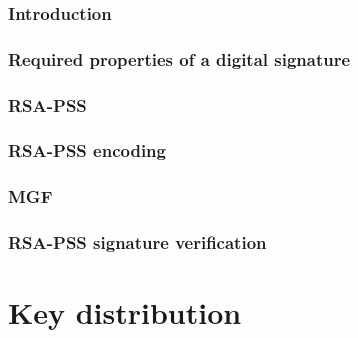 \documentclass[12pt]{article}
\begin{document}
 \subsubsection{Introduction}
 \subsubsection{Required properties of a digital signature}
 \subsubsection{RSA-PSS}
 \subsubsection{RSA-PSS encoding}
 \subsubsection{MGF}
 \subsubsection{RSA-PSS signature verification}
 
 \section{Key distribution}
  
\end{document}
